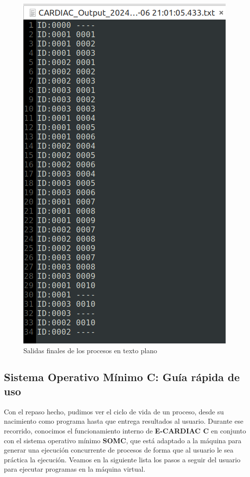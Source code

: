 \documentclass[letterpaper,12pt,oneside]{book}
\begin{document}
		
		\begin{figure}[h]		
			\centering
			\includegraphics[scale=0.42]{media/CARDIACC/Salida3Procesos.png}
			\caption{Salidas finales de los procesos en texto plano}
			\label{fig:Salida3Procesos}
		\end{figure}

		\clearpage
		
		\subsection{Sistema Operativo Mínimo C: Guía rápida de uso}
		
			Con el repaso hecho, pudimos ver el ciclo de vida de un proceso, desde su nacimiento como programa hasta que entrega resultados al usuario.
			Durante ese recorrido, conocimos el funcionamiento interno de \textbf{E-CARDIAC C} en conjunto con el 
			sistema operativo mínimo \textbf{SOMC}, que
			está adaptado a la máquina para generar una ejecución concurrente de procesos de forma que al usuario le sea práctica la ejecución. Veamos
			en la siguiente lista los pasos a seguir del usuario para ejecutar programas en la máquina virtual.
			
\end{document}
